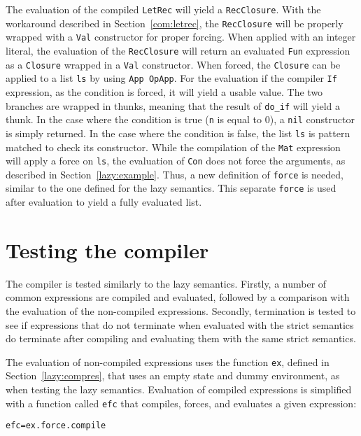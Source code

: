 The evaluation of the compiled \texttt{LetRec} will yield a \texttt{RecClosure}.
With the workaround described in Section~\ref{com:letrec}, the \texttt{RecClosure}
will be properly wrapped with a \texttt{Val} constructor for proper forcing.
When applied with an integer literal, the evaluation of the \texttt{RecClosure}
will return an evaluated \texttt{Fun} expression as a \texttt{Closure} wrapped
in a \texttt{Val} constructor. When forced, the \texttt{Closure} can be applied
to a list \texttt{ls} by using \texttt{App OpApp}. For the evaluation if the
compiler \texttt{If} expression, as the condition is forced, it will yield a
usable value. The two branches are wrapped in thunks, meaning that the result
of \texttt{do\_if} will yield a thunk. In the case where the condition is true
(\texttt{n} is equal to 0), a \texttt{nil} constructor is simply returned.
In the case where the condition is false, the list \texttt{ls} is pattern matched
to check its constructor. While the compilation of the \texttt{Mat} expression
will apply a force on \texttt{ls}, the evaluation of \texttt{Con} does not force
the arguments, as described in Section~\ref{lazy:example}. Thus, a new
definition of \texttt{force} is needed, similar to the one defined for the lazy
semantics. This separate \texttt{force} is used after evaluation to yield a
fully evaluated list.


\section{Testing the compiler}
\label{compiler:test}
The compiler is tested similarly to the lazy semantics. Firstly, a number of
common expressions are compiled and evaluated, followed by a comparison with
the evaluation of the non-compiled expressions. Secondly, termination is tested
to see if expressions that do not terminate when evaluated with the strict
semantics do terminate after compiling and evaluating them with the same
strict semantics.

The evaluation of non-compiled expressions uses the function \texttt{ex},
defined in Section~\ref{lazy:compres}, that uses an empty state and
dummy environment, as when testing the lazy semantics. Evaluation of
compiled expressions is simplified with a function called \texttt{efc} that
compiles, forces, and evaluates a given expression:

\begin{alltt}
  efc = ex . force . compile
\end{alltt}

